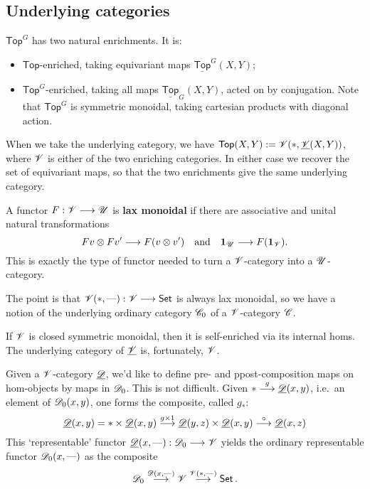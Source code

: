 \documentclass[11pt]{article}
\begin{document}
\begin{4. Basic concepts in enriched category theory}
\subsection*{Underlying categories}
\begin{itemise}
\setlength{\parindent}{.25in}
\item $\mathsf{Top}^G$ has two natural enrichments. It is:
\begin{itemize}\squishlist
\setlength{\parindent}{.25in}
\item $\mathsf{Top}$-enriched, taking equivariant maps $\underline{\mathsf{Top}}^G(X,Y)$;
\item $\mathsf{Top}^G$-enriched, taking all maps $\underline{\mathsf{Top}}_G(X,Y)$, acted on by conjugation. Note that $\mathsf{Top}^G$ is symmetric monoidal, taking cartesian products with diagonal action.
\end{itemize}
When we take the underlying category, we have $\mathsf{Top}(X,Y):=\mathscr{V}(*,\underline{\mathscr{V}}(X,Y))$, where $\mathscr{V}$ is either of the two enriching categories. In either case we recover the set of equivariant maps, so that the two enrichments give the same underlying category.
\item A functor $F:\mathscr{V}\longrightarrow\mathscr{U}$ is \textbf{lax monoidal} if there are associative and unital natural transformations
\[Fv\otimes Fv'\longrightarrow F(v\otimes v') \quad \textup{and}\quad \textbf{1}_{\mathscr{U}}\longrightarrow F(\textbf{1}_{\mathscr{V}}).\]
This is exactly the type of functor needed to turn a $\mathscr{V}$-category into a $\mathscr{U}$-category. 
\item The point is that $\mathscr{V}(*,\textup{---} ):\mathscr{V}\longrightarrow\operatorname{{\mathsf{Set}}}$ is always lax monoidal, so we have a notion of the underlying ordinary category $\mathscr{C}_0$ of a $\mathscr{V}$-category $\mathscr{C}$.
\item If $\mathscr{V}$ is closed symmetric monoidal, then it is self-enriched via its internal homs. The underlying category of $\underline{\mathscr{V}}$ is, fortunately, $\mathscr{V}$.
\item Given a $\mathscr{V}$-category $\underline{\mathscr{D}}$, we'd like to define pre- and ppost-composition maps on hom-objects by maps in $\mathscr{D}_0$. This is not difficult. Given $*\overset{g}{\longrightarrow}\underline{\mathscr{D}}(x,y)$, i.e.\ an element of $\mathscr{D}_0(x,y)$, one forms the composite, called $g_*$:
\[\underline{\mathscr{D}}(x,y)=*\times\underline{\mathscr{D}}(x,y)\overset{g\times 1}{\longrightarrow}\underline{\mathscr{D}}(y,z)\times\underline{\mathscr{D}}(x,y)\overset{\circ}{\longrightarrow}\underline{\mathscr{D}}(x,z) \]
This `representable' functor $\underline{\mathscr{D}}(x,\textup{---} ):\mathscr{D}_0\longrightarrow\mathscr{V}$ yields the ordinary representable functor $\mathscr{D}_0(x,\textup{---} )$ as the composite
\[\mathscr{D}_0\overset{\mathscr{D}(x,\textup{---} )}{\longrightarrow}\mathscr{V}\overset{\mathscr{V}(*,\textup{---} )}{\longrightarrow}\operatorname{{\mathsf{Set}}}.\]
\end{itemise}

\end{4. Basic concepts in enriched category theory}
\end{document}
